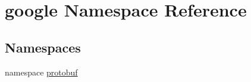 \hypertarget{namespacegoogle}{
\section{google Namespace Reference}
\label{namespacegoogle}
}
\subsection*{Namespaces}
\begin{DoxyCompactItemize}
\item 
namespace \hyperlink{namespacegoogle_1_1protobuf}{protobuf}
\end{DoxyCompactItemize}
